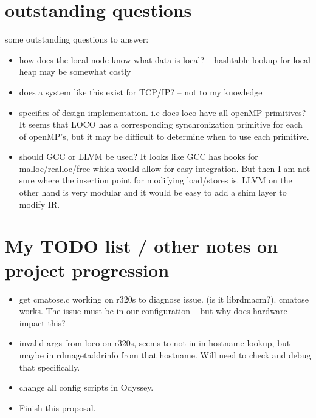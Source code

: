 \documentclass[sigplan,nonacm]{acmart}
\begin{document}
\section{outstanding questions}
some outstanding questions to answer:
\begin{itemize}
    \item how does the local node know what data is local? -- hashtable lookup for local heap 
    may be somewhat costly
    \item does a system like this exist for TCP/IP? -- not to my knowledge
    \item specifics of design implementation. i.e does loco have all openMP primitives? It 
    seems that LOCO has a corresponding synchronization primitive for each of openMP's, but it 
    may be difficult to determine when to use each primitive.
    \item should GCC or LLVM be used? It looks like GCC has hooks for malloc/realloc/free which 
    would allow for easy integration. But then I am not sure where the insertion point for modifying 
    load/stores is. LLVM on the other hand is very modular and it would be easy to add a shim layer 
    to modify IR. 
\end{itemize}

\section{My TODO list / other notes on project progression}
\begin{itemize}
    \item get cmatose.c working on r320s to diagnose issue. (is it librdmacm?). cmatose
    works. The issue must be in our configuration -- but why does hardware impact this?
    \item invalid args from loco on r320s, seems to not in in hostname lookup, but maybe 
    in rdmagetaddrinfo from that hostname. Will need to check and debug that specifically.
    \item change all config scripts in Odyssey.
    \item Finish this proposal.
\end{itemize}


% 
% 
\end{document}
